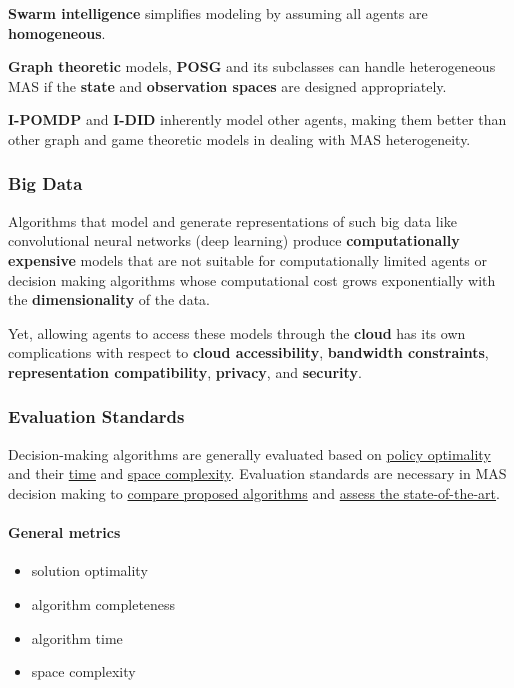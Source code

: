 \documentclass{article}
\begin{document}
				\textbf{Swarm intelligence} simplifies modeling by assuming all agents are \textbf{homogeneous}. 
				
				\textbf{Graph theoretic} models, \textbf{POSG} and its subclasses can handle heterogeneous MAS if the \textbf{state} and \textbf{observation spaces} are designed appropriately. 
				
				\textbf{I-POMDP} and \textbf{I-DID} inherently model other agents, making them better than other graph and game theoretic models in dealing with MAS heterogeneity.
				
				
				\subsubsection{Big Data}
					Algorithms that model and generate representations of such big data like  convolutional neural networks (deep learning) produce \textbf{computationally expensive} models that are not suitable for computationally limited agents or decision making algorithms whose computational cost grows exponentially with the  \textbf{dimensionality} of the data. 
					
					Yet, allowing agents to access these models through the \textbf{cloud} has its own complications with respect to \textbf{cloud accessibility}, \textbf{bandwidth constraints}, \textbf{representation compatibility}, \textbf{privacy}, and \textbf{security}.
					
					
				\subsubsection{Evaluation Standards}
					Decision-making algorithms are generally evaluated based on \underline{policy optimality} and their \underline{time} and \underline{space complexity}.
					Evaluation standards are necessary in MAS decision making to \underline{compare proposed algorithms} and \underline{assess the state-of-the-art}. 
					
					\paragraph{General metrics}
						\begin{itemize}
							\item solution optimality
							\item algorithm completeness
							\item algorithm time
							\item space complexity
						\end{itemize}
					
\end{document}
